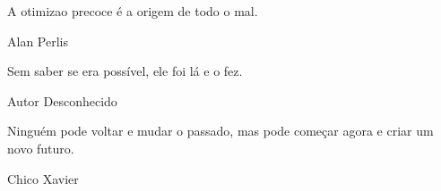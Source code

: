 \null %
\vfill
\epigraph{A otimiza\ca o precoce \'e a origem de todo o mal.}{Alan Perlis}
\epigraph{Sem saber se era poss\'ivel, ele foi l\'a e o fez.}{Autor Desconhecido}
\epigraph{Ninguém pode voltar e mudar o passado, mas pode começar agora e criar um novo futuro.}{Chico Xavier}